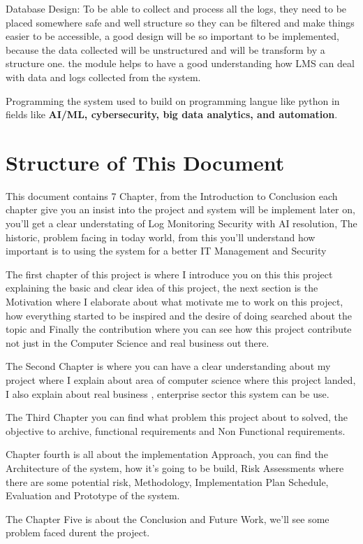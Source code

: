 Database Design: To be able to collect and process all the logs, they need to be placed somewhere safe and well structure so they can be filtered and make things easier to be accessible, a good design will be so important to be implemented, because the data collected will be unstructured and will be transform by a structure one. the module helps to have a good understanding how LMS can deal with data and logs collected from the system.

Programming the system used to build on programming langue like python in fields like \textbf{AI/ML, cybersecurity, big data analytics, and automation}.





\section{Structure of This Document}
This document contains 7 Chapter, from the Introduction to Conclusion each chapter give you an insist into the project and system will be implement later on, you'll get a clear understating of Log Monitoring Security with AI resolution, The historic, problem facing in today world, from this you'll understand how important is to using the system for a better IT Management and Security

The first chapter of this project is where I introduce you on this this project explaining the basic and clear idea of this project, the next section is the Motivation where I elaborate about what motivate me to work on this project, how everything started to be inspired and the desire of doing searched about the topic and Finally the contribution where you can see how this project contribute not just in the Computer Science and real business out there.

The Second Chapter is where you can have a clear understanding about my project where I explain about area of computer science where this project landed, I also explain about real business , enterprise sector this system can be use.

The Third Chapter you can find what problem this project about to solved, the objective to archive, functional requirements and Non Functional requirements.

Chapter fourth is all about the implementation Approach, you can find the Architecture of the system, how it's going to be build, Risk Assessments where there are some potential risk, Methodology, Implementation Plan Schedule, Evaluation and Prototype of the system.

The Chapter Five is about the Conclusion and Future Work, we'll see some problem faced durent the project. 


